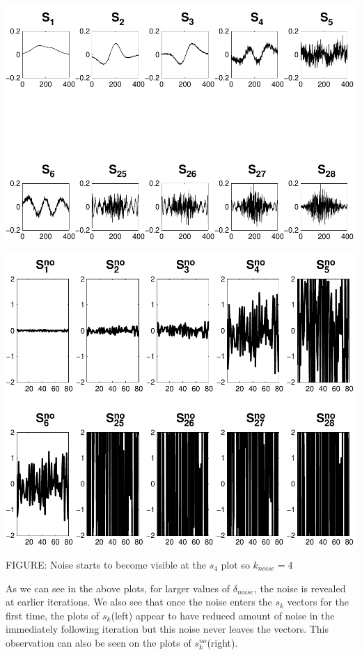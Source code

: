 \documentclass[11pt]{amsart}
\begin{document}
	\vspace{10mm}
	\begin{minipage}[t]{0.5\textwidth}
	
		\includegraphics[width=.95\linewidth]{figures/run4/sk_plots} 
   
	\end{minipage}
	\begin{minipage}[t]{0.5\textwidth}
	
		\includegraphics[width=.75\linewidth]{figures/run4/noise_parts} 
   
	\end{minipage}
	\begin{center}
		FIGURE: 
		Noise starts to become visible at the $s_{4}$ plot so $k_{noise}=4$	\end{center} 
	\vspace{10mm}
	
	
	As we can see in the above plots, for larger values of $\delta_{noise}$, the
	noise is revealed at earlier iterations. We also see that once the noise enters
	the $s_k$ vectors for the first time, the plots of $s_k$(left) appear to have 
	reduced amount of noise in the immediately following iteration but this 
	noise never leaves the vectors. This observation can also be seen on the
	plots of $s_{k}^{no}$(right).
\end{document}
